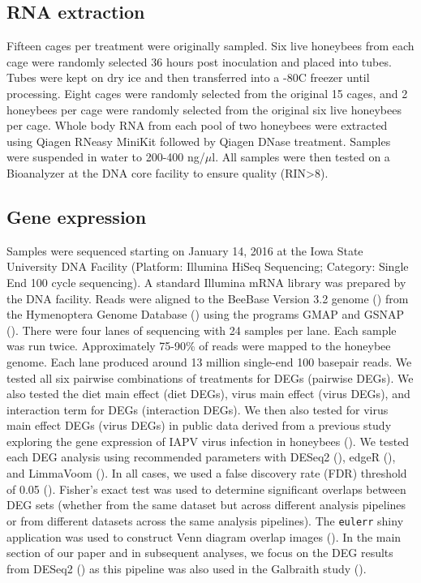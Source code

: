 \documentclass[11pt,a4paper,oldfontcommands,openany]{memoir}
\numberwithin{equation}{section} %
\newcommand{\pkg}[1]{{\texttt{#1}}}
\begin{document}
\subsection{RNA extraction}

Fifteen cages per treatment were originally sampled. Six live honeybees from each cage were randomly selected 36 hours post inoculation and placed into tubes. Tubes were kept on dry ice and then transferred into a -80C freezer until processing. Eight cages were randomly selected from the original 15 cages, and 2 honeybees per cage were randomly selected from the original six live honeybees per cage. Whole body RNA from each pool of two honeybees were extracted using Qiagen RNeasy MiniKit followed by Qiagen DNase treatment. Samples were suspended in water to 200-400 ng/$\mu$l. All samples were then tested on a Bioanalyzer at the DNA core facility to ensure quality (RIN>8).

\subsection{Gene expression}

Samples were sequenced starting on January 14, 2016 at the Iowa State University DNA Facility (Platform: Illumina HiSeq Sequencing; Category: Single End 100 cycle sequencing). A standard Illumina mRNA library was prepared by the DNA facility. Reads were aligned to the BeeBase Version 3.2 genome (\citealt{hbGenome}) from the Hymenoptera Genome Database (\citealt{hymenopteraDB}) using the programs GMAP and GSNAP (\citealt{gsnap}). There were four lanes of sequencing with 24 samples per lane. Each sample was run twice. Approximately 75-90\% of reads were mapped to the honeybee genome. Each lane produced around 13 million single-end 100 basepair reads. We tested all six pairwise combinations of treatments for DEGs (pairwise DEGs). We also tested the diet main effect (diet DEGs), virus main effect (virus DEGs), and interaction term for DEGs (interaction DEGs). We then also tested for virus main effect DEGs (virus DEGs) in public data derived from a previous study exploring the gene expression of IAPV virus infection in honeybees (\citealt{galbraith}). We tested each DEG analysis using recommended parameters with DESeq2 (\citealt{deseq2}), edgeR (\citealt{edger}), and LimmaVoom (\citealt{limma}). In all cases, we used a false discovery rate (FDR) threshold of 0.05 (\citealt{benjamini}). Fisher's exact test was used to determine significant overlaps between DEG sets (whether from the same dataset but across different analysis pipelines or from different datasets across the same analysis pipelines). The \pkg{eulerr} shiny application was used to construct Venn diagram overlap images (\citealt{euler}). In the main section of our paper and in subsequent analyses, we focus on the DEG results from DESeq2 (\citealt{deseq2}) as this pipeline was also used in the Galbraith study (\citealt{galbraith}).
\end{document}
